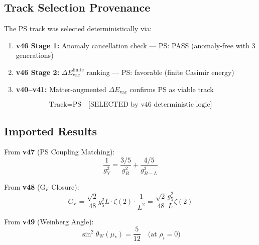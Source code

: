 \documentclass[11pt,a4paper]{article}
\theoremstyle{definition}
\begin{document}
\subsection{Track Selection Provenance}
\label{subsec:track_provenance}

The PS track was selected deterministically via:

\begin{enumerate}[label=(\roman*)]
\item \textbf{v46 Stage 1:} Anomaly cancellation check --- PS: PASS (anomaly-free with 3 generations)
\item \textbf{v46 Stage 2:} $\Delta E_{\text{vac}}^{\text{finite}}$ ranking --- PS: favorable (finite Casimir energy)
\item \textbf{v40--v41:} Matter-augmented $\Delta E_{\text{vac}}$ confirms PS as viable track
\end{enumerate}

\begin{equation}
\label{eq:track_selection}
\text{Track} = \text{PS} \quad \text{[SELECTED by v46 deterministic logic]}
\end{equation}

\subsection{Imported Results}
\label{subsec:imported}

From \textbf{v47} (PS Coupling Matching):
\begin{equation}
\label{eq:import_v47}
\frac{1}{g_Y^2} = \frac{3/5}{g_R^2} + \frac{4/5}{g_{B-L}^2}
\end{equation}

From \textbf{v48} (G$_F$ Closure):
\begin{equation}
\label{eq:import_v48}
G_F = \frac{\sqrt{2}}{48} g_5^2 L \cdot \zeta(2) \cdot \frac{1}{L^2} = \frac{\sqrt{2}}{48} \frac{g_5^2}{L} \zeta(2)
\end{equation}

From \textbf{v49} (Weinberg Angle):
\begin{equation}
\label{eq:import_v49}
\sin^2\theta_W(\mu_*) = \frac{5}{12} \quad \text{(at } \rho_i = 0\text{)}
\end{equation}
\end{document}
